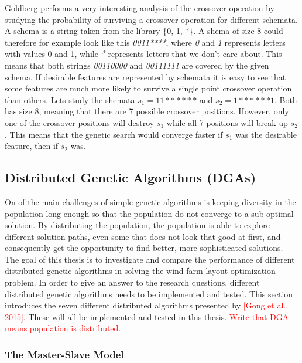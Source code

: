 \noindent Goldberg performs a very interesting analysis of the crossover operation by studying the probability of surviving a crossover operation for different schemata. A schema is a string taken from the library \{0, 1, *\}.  A shema of size 8 could therefore for example look like this \textit{0011****}, where \textit{0} and \textit{1} represents letters with values 0 and 1, while \textit{*} represents letters that we don't care about. This means that both strings \textit{00110000} and \textit{00111111} are covered by the given schema. If desirable features are represented by schemata it is easy to see that some features are much more likely to survive a single point crossover operation than others. Lets study the shemata $s_1 = 11******$ and $s_2  = 1******1$. Both has size 8, meaning that there are 7 possible crossover positions. However, only one of the crossover positions will destroy $s_1$ while all 7 positions will break up $s_2$. This means that the genetic search would converge faster if $s_1$ was the desirable feature, then if $s_2$ was.


\subsection{Distributed Genetic Algorithms (DGAs)}
On of the main challenges of simple genetic algorithms is keeping diversity in the population long enough so that the population do not converge to a sub-optimal solution. By distributing the population, the population is able to explore different solution paths, even some that does not look that good at first, and consequently get the opportunity to find better, more sophisticated solutions. \\

\noindent The goal of this thesis is to investigate and compare the performance of different distributed genetic algorithms in solving the wind farm layout optimization problem. In order to give an answer to the research questions, different distributed genetic algorithms needs to be implemented and tested. This section introduces the seven different distributed algorithms presented by \textcolor{red}{[Gong et al., 2015]}. These will all be implemented and tested in this thesis. \textcolor{red}{Write that DGA means population is distributed.}\\


\subsubsection{The Master-Slave Model}

